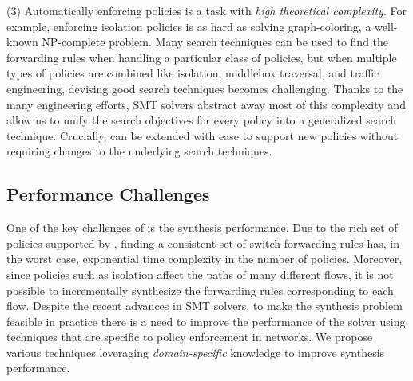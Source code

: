 (3) Automatically enforcing policies is a task with
\emph{high theoretical complexity}. 
For example, enforcing isolation policies
is as hard as solving
graph-coloring, a well-known
NP-complete problem.
Many search techniques can be used to find the forwarding rules when
handling a particular class of policies, but when multiple types of
policies are combined like isolation, middlebox traversal, and traffic
engineering, devising good search techniques becomes challenging.
Thanks to the many engineering efforts, SMT solvers abstract away most
of this complexity and allow us to unify the search objectives for
every policy into a generalized search technique.
Crucially, \Name can be extended with ease to
support new policies without requiring changes to the underlying search
techniques.

\subsection{Performance Challenges} \label{sec:performance}

One of the key challenges of \Name is the synthesis
performance. 
Due to the rich set of policies supported by \Name,
finding a consistent set of switch forwarding rules 
has, in the worst case, exponential time complexity in
the number of policies.
Moreover, since policies such as isolation affect
the paths of many different flows, it is not possible to incrementally synthesize
the forwarding rules corresponding to each flow. 
Despite the recent advances in SMT solvers, to make
the synthesis problem feasible in practice
there is a need to improve the performance of the solver
using techniques that are specific to policy enforcement in networks.
We propose various techniques leveraging
\emph{domain-specific} knowledge to improve synthesis performance. 

